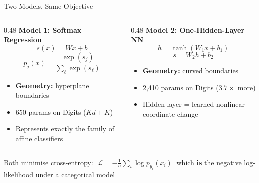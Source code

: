 \documentclass[11pt,aspectratio=169]{beamer}
\begin{document}
\begin{frame}{Two Models, Same Objective}

\begin{columns}[T]
\begin{column}{0.48\textwidth}
\textbf{Model 1: Softmax Regression}
\[
s(x) = Wx + b
\]
\[
p_j(x) = \frac{\exp(s_j)}{\sum_\ell \exp(s_\ell)}
\]
\begin{itemize}
    \item \textbf{Geometry:} hyperplane boundaries
    \item 650 params on Digits ($Kd + K$)
    \item Represents exactly the family of affine classifiers
\end{itemize}
\end{column}

\begin{column}{0.48\textwidth}
\textbf{Model 2: One-Hidden-Layer NN}
\[
h = \tanh(W_1 x + b_1)
\]
\[
s = W_2 h + b_2
\]
\begin{itemize}
    \item \textbf{Geometry:} curved boundaries
    \item 2{,}410 params on Digits ($3.7\times$ more)
    \item Hidden layer = learned nonlinear coordinate change
\end{itemize}
\end{column}
\end{columns}

\vspace{0.5em}
\centering
Both minimise cross-entropy: $\;\mathcal{L} = -\frac{1}{n}\sum_i \log p_{y_i}(x_i)\;$ which \textbf{is} the negative log-likelihood under a categorical model

\end{frame}
\end{document}
